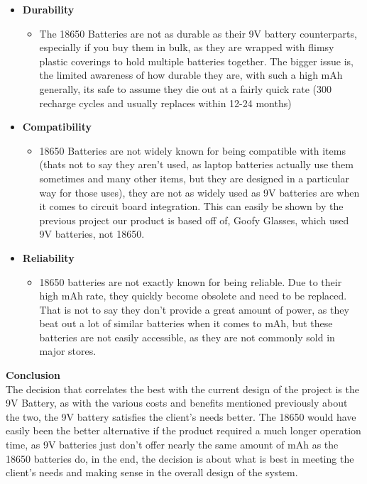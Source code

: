 \documentclass[12pt]{article}
\begin{document}
{\begin{itemize}
\begin{itemize}
							\end{itemize}
							\item \textbf{Durability}
							\begin{itemize}
								\item The 18650 Batteries are not as durable as their 9V battery counterparts, especially if you buy them in bulk, as they are wrapped with flimsy plastic coverings to hold multiple batteries together. The bigger issue is, the limited awareness of how durable they are, with such a high mAh generally, its safe to assume they die out at a fairly quick rate (300 recharge cycles and usually replaces within 12-24 months)
							\end{itemize}
							\item \textbf{Compatibility}
							\begin{itemize}
								\item 18650 Batteries are not widely known for being compatible with items (thats not to say they aren't used, as laptop batteries actually use them sometimes and many other items, but they are designed in a particular way for those uses), they are not as widely used as 9V batteries are when it comes to circuit board integration. This can easily be shown by the previous project our product is based off of, Goofy Glasses, which used 9V batteries, not 18650.
							\end{itemize}
							\item \textbf{Reliability}
							\begin{itemize}
								\item 18650 batteries are not exactly known for being reliable. Due to their high mAh rate, they quickly become obsolete and need to be replaced. That is not to say they don't provide a great amount of power, as they beat out a lot of similar batteries when it comes to mAh, but these batteries are not easily accessible, as they are not commonly sold in major stores.
							\end{itemize}
						\end{itemize}
					}
					
					\noindent\textbf{Conclusion}\\
					\indent The decision that correlates the best with the current design of the project is the 9V Battery, as with the various costs and benefits mentioned previously about the two, the 9V battery satisfies the client's needs better. The 18650 would have easily been the better alternative if the product required a much longer operation time, as 9V batteries just don't offer nearly the same amount of mAh as the 18650 batteries do, in the end, the decision is about what is best in meeting the client's needs and making sense in the overall design of the system.
					
\end{document}
